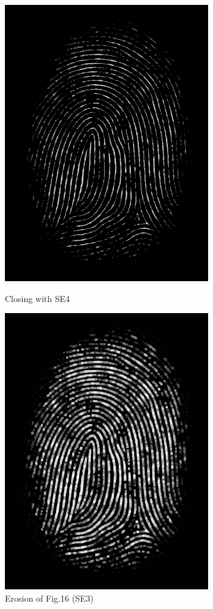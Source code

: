 \documentclass{article}
\begin{document}
\begin{figure}[H] 
  \label{ fig7} 
  \begin{minipage}[b]{0.5\linewidth}
    \centering
    \includegraphics[height=.97\linewidth]{e_fingerprint.png} 
    \caption{Closing with SE4} 
    \vspace{4ex}
  \end{minipage}%
  \begin{minipage}[b]{0.5\linewidth}
    \centering
    \includegraphics[height=.97\linewidth]{o_fingerprint.png} 
    \caption{Erosion of Fig.16 (SE3)} 
    \vspace{4ex}
  \end{minipage} 
\end{figure} 
\begin{flushleft}
\end{flushleft}
\end{document}
